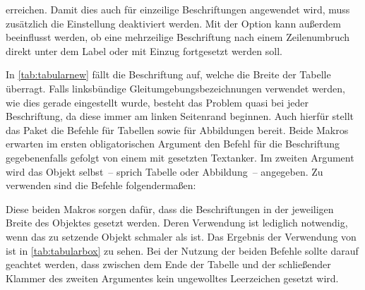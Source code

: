 \documentclass[%
  english,ngerman,%
  geometry=no,DIV=12,automark,%
]{tudscrartcl}
\begin{document}
erreichen. Damit dies auch für einzeilige Beschriftungen angewendet wird, muss 
zusätzlich die Einstellung  deaktiviert werden. Mit der 
Option  kann außerdem beeinflusst werden, ob eine mehrzeilige 
Beschriftung nach einem Zeilenumbruch direkt unter dem Label oder mit Einzug 
fortgesetzt werden soll.
%
\begin{Preamble*}
\captionsetup{singlelinecheck=off,format=hang,justification=raggedright}

\end{Preamble*}
%
In \autoref{tab:tabularnew} fällt die Beschriftung auf, welche die Breite der 
Tabelle überragt. Falls linksbündige Gleitumgebungsbezeichnungen verwendet 
werden, wie dies gerade eingestellt wurde, besteht das Problem quasi bei jeder 
Beschriftung, da diese immer am linken Seitenrand beginnen. Auch hierfür stellt 
das Paket  die Befehle  für Tabellen sowie 
 für Abbildungen bereit. Beide Makros erwarten im ersten 
obligatorischen Argument den Befehl  für die Beschriftung 
gegebenenfalls gefolgt von einem mit  gesetzten Textanker. Im 
zweiten Argument wird das Objekt selbst~-- sprich Tabelle oder Abbildung~-- 
angegeben. Zu verwenden sind die Befehle folgendermaßen:
%
%
Diese beiden Makros sorgen dafür, dass die Beschriftungen in der jeweiligen 
Breite des Objektes gesetzt werden. Deren Verwendung ist lediglich notwendig, 
wenn das zu setzende Objekt schmaler als  ist. Das Ergebnis 
der Verwendung von  ist in \autoref{tab:tabularbox} zu sehen. 
Bei der Nutzung der beiden Befehle sollte darauf geachtet werden, dass zwischen 
dem Ende der Tabelle und der schließender Klammer des zweiten Argumentes kein 
ungewolltes Leerzeichen gesetzt wird.

\begin{table}
\end{table}
\end{document}
